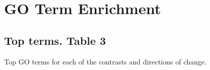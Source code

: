 \documentclass[11pt]{article}\usepackage[]{graphicx}\usepackage[usenames,dvipsnames]{color}
\begin{document}
\clearpage












\clearpage


\section{GO Term Enrichment}



\subsection{Top terms. Table 3}
Top GO terms for each of the contrasts and directions of change.
\end{document}
